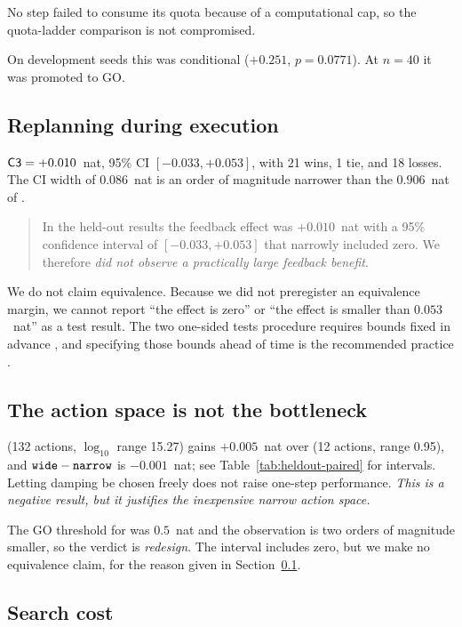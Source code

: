 No step failed to consume its quota because of a computational cap, so the
quota-ladder comparison is not compromised.

On development seeds this was conditional ($+0.251$, $p = 0.0771$). At $n = 40$ it
was promoted to GO.

\subsection{Replanning during execution}
\label{sec:c3}

$\textsf{C3} = +0.010$~nat, 95\% CI $[-0.033, +0.053]$, with 21 wins, 1 tie, and 18
losses. The CI width of $0.086$~nat is an order of magnitude narrower than the
$0.906$~nat of .

\begin{quote}
In the held-out results the feedback effect was $+0.010$~nat with a 95\%
confidence interval of $[-0.033, +0.053]$ that narrowly included zero. We
therefore \emph{did not observe a practically large feedback benefit}.
\end{quote}

We do not claim equivalence. Because we did not preregister an equivalence margin,
we cannot report ``the effect is zero'' or ``the effect is smaller than
$0.053$~nat'' as a test result. The two one-sided tests procedure requires bounds
fixed in advance \citep{schuirmann1987tost}, and specifying those bounds ahead of
time is the recommended practice \citep{lakens2017equivalence}.

\subsection{The action space is not the bottleneck}
\label{sec:actionspace}

 (132 actions, $\log_{10}$ range 15.27) gains $+0.005$~nat over
 (12 actions, range 0.95), and $\texttt{wide} - \texttt{narrow}$ is
$-0.001$~nat; see Table~\ref{tab:heldout-paired} for intervals. Letting damping be
chosen freely does not raise one-step performance. \emph{This is a negative result,
but it justifies the inexpensive narrow action space.}

The GO threshold for  was $0.5$~nat and the observation is two orders of
magnitude smaller, so the verdict is \emph{redesign}. The interval includes zero,
but we make no equivalence claim, for the reason given in Section~\ref{sec:c3}.

\subsection{Search cost}
\label{sec:cost}

\begin{table}[!ht]
  \centering
  
  \caption{Median decision-search cost on held-out instances, relative to the
  $150$~GE deployment budget. The reported headroom was obtained by an oracle that
  consumed $1{,}294$ times the deployment budget. We do not hide this figure.}
  \label{tab:heldout-cost}
\end{table}
